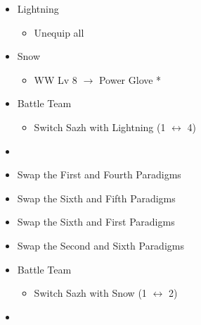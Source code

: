 \begin{paracol}{2}
\begin{menu}
\begin{itemize}
\begin{itemize}
		\end{itemize}
		\equip
		\begin{itemize}
			\item Lightning
			      \begin{itemize}
				      \item Unequip all
			      \end{itemize}
			\item Snow
			      \begin{itemize}
				      \item WW Lv 8 $\rightarrow$ Power Glove *
			      \end{itemize}
		\end{itemize}
		\paradigm
		\begin{itemize}
			\item Battle Team
			      \begin{itemize}
				      \item Switch Sazh with Lightning (1 $\leftrightarrow$ 4)
			      \end{itemize}
			\item {}%
			      {\paradigmline{\com}{\sen}{\med}}%
			      {\paradigmline{(\rav)}{\rav}{\rav}}%
			      {\paradigmline{(\rav)}{\sen}{(\rav)}}%
			      {\paradigmline[4]{\textit{(\com)}}{\textit{\com}}{\textit{(\com)}}}%
			      {\paradigmline{\rav}{\com}{(\com)}}%
			      {\paradigmline{\rav}{\com}{(\rav)}}
			\item Swap the First and Fourth Paradigms
			\item Swap the Sixth and Fifth Paradigms
			\item Swap the Sixth and First Paradigms
			\item Swap the Second and Sixth Paradigms
		\end{itemize}
	\end{itemize}
\end{menu}
\switchcolumn
\begin{menu}
	\begin{itemize}
		\paradigm
		\begin{itemize}
			\item Battle Team
			      \begin{itemize}
				      \item Switch Sazh with Snow (1 $\leftrightarrow$ 2)
			      \end{itemize}
			\item {}%
			      {\paradigmline{(\rav)}{\com}{\com}}%

\end{itemize}
\end{itemize}
\end{menu}
\end{paracol}
